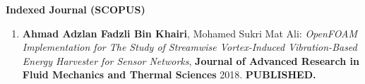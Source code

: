 \documentclass[oneside]{utmthesis}
\begin{document}
\noindent \textbf{Indexed Journal (SCOPUS)}
\begin{enumerate}
  \item \textbf{Ahmad Adzlan Fadzli Bin Khairi}, Mohamed Sukri Mat Ali: \textit{OpenFOAM Implementation for The Study of Streamwise Vortex-Induced Vibration-Based Energy Harvester for Sensor Networks}, \textbf{Journal of Advanced Research in Fluid Mechanics and Thermal Sciences} 2018. \textbf{PUBLISHED.}
\end{enumerate}

\endmatter
\end{document}
